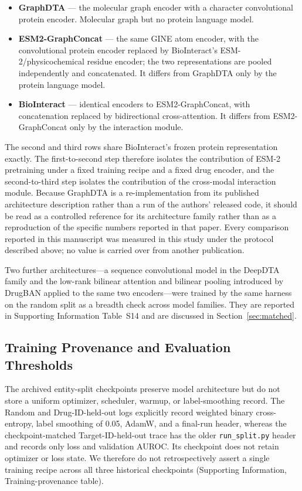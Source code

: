 \documentclass[fleqn,10pt]{wlscirep}
\begin{document}
\begin{itemize}[leftmargin=*]
\item \textbf{GraphDTA}\cite{nguyen2021graphdta} --- the molecular graph
  encoder with a character convolutional protein encoder.  Molecular graph but
  no protein language model.
\item \textbf{ESM2-GraphConcat} --- the same GINE atom encoder, with the
  convolutional protein encoder replaced by BioInteract's
  ESM-2/physicochemical residue encoder; the two representations are pooled
  independently and concatenated.  It differs from GraphDTA only by the protein
  language model.
\item \textbf{BioInteract} --- identical encoders to ESM2-GraphConcat, with
  concatenation replaced by bidirectional cross-attention.  It differs from
  ESM2-GraphConcat only by the interaction module.
\end{itemize}

The second and third rows share BioInteract's frozen protein representation
exactly.  The first-to-second step therefore isolates the contribution of ESM-2
pretraining under a fixed training recipe and a fixed drug encoder, and the
second-to-third step isolates the contribution of the cross-modal interaction
module.  Because GraphDTA is a re-implementation from its published
architecture description rather than a run of the authors' released code, it
should be read as a controlled reference for its architecture family rather
than as a reproduction of the specific numbers reported in that paper.  Every
comparison reported in this manuscript was measured in this study under the
protocol described above; no value is carried over from another publication.

Two further architectures---a sequence convolutional model in the DeepDTA
family\cite{ozturk2018deepdta} and the low-rank bilinear attention and bilinear
pooling introduced by DrugBAN\cite{bai2023drugban} applied to the same two
encoders---were trained by the same harness on the random split as a breadth
check across model families.  They are reported in Supporting Information
Table~S14 and are discussed in Section~\ref{sec:matched}.

\subsection{Training Provenance and Evaluation Thresholds}

The archived entity-split checkpoints preserve model architecture but do not
store a uniform optimizer, scheduler, warmup, or label-smoothing record. The
Random and Drug-ID-held-out logs explicitly record weighted binary
cross-entropy, label smoothing of 0.05, AdamW, and a final-run header, whereas
the checkpoint-matched Target-ID-held-out trace has the older
\texttt{run\_split.py} header and records only loss and validation AUROC. Its
checkpoint does not retain optimizer or loss state. We therefore do not
retrospectively assert a single training recipe across all three historical
checkpoints (Supporting Information, Training-provenance table).
\end{document}
